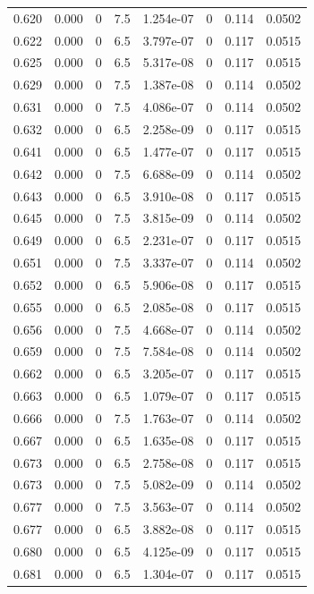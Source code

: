 \documentclass[preview]{standalone}
\begin{document}
{{{{{{{{\begin{tabular}{L{1.2cm}C{1.2cm} C{0.3cm}C{0.5cm} C{1.4cm}C{1.4cm} C{1.4cm}C{1.4cm}}
  0.620  &  0.000  & 0     & 7.5 &  1.254e-07  & 0  & 0.114 &  0.0502   \\ 
  0.622  &  0.000  & 0     & 6.5 &  3.797e-07  & 0  & 0.117 &  0.0515   \\ 
  0.625  &  0.000  & 0     & 6.5 &  5.317e-08  & 0  & 0.117 &  0.0515   \\ 
  0.629  &  0.000  & 0     & 7.5 &  1.387e-08  & 0  & 0.114 &  0.0502   \\ 
  0.631  &  0.000  & 0     & 7.5 &  4.086e-07  & 0  & 0.114 &  0.0502   \\ 
  0.632  &  0.000  & 0     & 6.5 &  2.258e-09  & 0  & 0.117 &  0.0515   \\ 
  0.641  &  0.000  & 0     & 6.5 &  1.477e-07  & 0  & 0.117 &  0.0515   \\ 
  0.642  &  0.000  & 0     & 7.5 &  6.688e-09  & 0  & 0.114 &  0.0502   \\ 
  0.643  &  0.000  & 0     & 6.5 &  3.910e-08  & 0  & 0.117 &  0.0515   \\ 
  0.645  &  0.000  & 0     & 7.5 &  3.815e-09  & 0  & 0.114 &  0.0502   \\ 
  0.649  &  0.000  & 0     & 6.5 &  2.231e-07  & 0  & 0.117 &  0.0515   \\ 
  0.651  &  0.000  & 0     & 7.5 &  3.337e-07  & 0  & 0.114 &  0.0502   \\ 
  0.652  &  0.000  & 0     & 6.5 &  5.906e-08  & 0  & 0.117 &  0.0515   \\ 
  0.655  &  0.000  & 0     & 6.5 &  2.085e-08  & 0  & 0.117 &  0.0515   \\ 
  0.656  &  0.000  & 0     & 7.5 &  4.668e-07  & 0  & 0.114 &  0.0502   \\ 
  0.659  &  0.000  & 0     & 7.5 &  7.584e-08  & 0  & 0.114 &  0.0502   \\ 
  0.662  &  0.000  & 0     & 6.5 &  3.205e-07  & 0  & 0.117 &  0.0515   \\ 
  0.663  &  0.000  & 0     & 6.5 &  1.079e-07  & 0  & 0.117 &  0.0515   \\ 
  0.666  &  0.000  & 0     & 7.5 &  1.763e-07  & 0  & 0.114 &  0.0502   \\ 
  0.667  &  0.000  & 0     & 6.5 &  1.635e-08  & 0  & 0.117 &  0.0515   \\ 
  0.673  &  0.000  & 0     & 6.5 &  2.758e-08  & 0  & 0.117 &  0.0515   \\ 
  0.673  &  0.000  & 0     & 7.5 &  5.082e-09  & 0  & 0.114 &  0.0502   \\ 
  0.677  &  0.000  & 0     & 7.5 &  3.563e-07  & 0  & 0.114 &  0.0502   \\ 
  0.677  &  0.000  & 0     & 6.5 &  3.882e-08  & 0  & 0.117 &  0.0515   \\ 
  0.680  &  0.000  & 0     & 6.5 &  4.125e-09  & 0  & 0.117 &  0.0515   \\ 
  0.681  &  0.000  & 0     & 6.5 &  1.304e-07  & 0  & 0.117 &  0.0515   \\ 
\hline 
\end{tabular} 

}}}}}}}}
\end{document}

